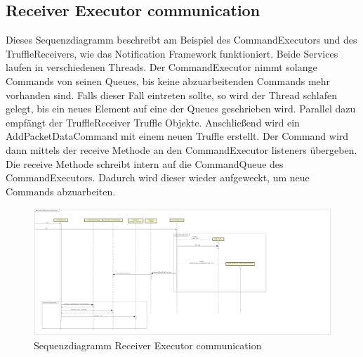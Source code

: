 \subsection{Receiver Executor communication}

Dieses Sequenzdiagramm beschreibt am Beispiel des CommandExecutors und des TruffleReceivers, wie das Notification Framework funktioniert.
Beide Services laufen in verschiedenen Threads. Der CommandExecutor nimmt solange Commands von seinen Queues, bis keine abzuarbeitenden
Commands mehr vorhanden sind. Falls dieser Fall eintreten sollte, so wird der Thread schlafen gelegt, bis ein neues Element auf eine
der Queues geschrieben wird. Parallel dazu empfängt der TruffleReceiver Truffle Objekte. Anschließend
wird ein AddPacketDataCommand mit einem neuen Truffle erstellt. Der Command wird dann mittels der receive Methode an den CommandExecutor listeners übergeben. Die receive Methode schreibt intern auf die CommandQueue des CommandExecutors. Dadurch wird dieser wieder aufgeweckt,
um neue Commands abzuarbeiten.

\FloatBarrier
\begin{figure}
  \centering
  \includegraphics[width=\textwidth]{../diagramimages/sd_receiver_executor_comm.png}
  \caption[Sequenzdiagramm Receiver Executor communication]{Sequenzdiagramm Receiver Executor communication}
\end{figure} \FloatBarrier 